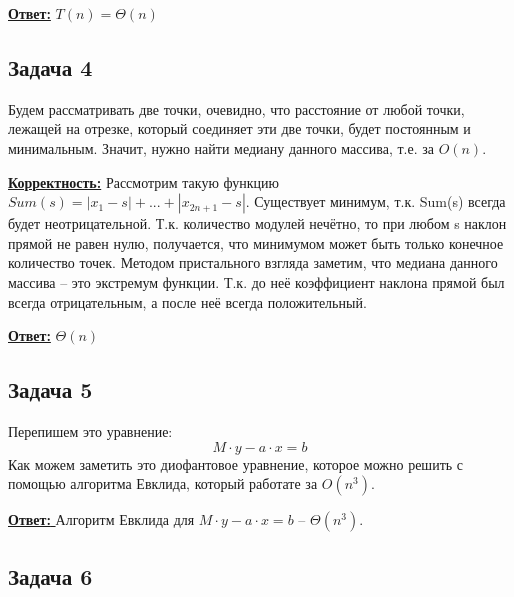\documentclass[a4paper,14pt]{article} %
\begin{document}
\underline{\textbf{Ответ:}} $T(n) = \Theta(n)$

\subsection{Задача 4}
Будем рассматривать две точки, очевидно, что расстояние от любой точки, лежащей на отрезке, который соединяет эти две точки, будет постоянным и минимальным.
Значит, нужно найти медиану данного массива, т.е. за $O(n)$.

\underline{\textbf{Корректность:}} Рассмотрим такую функцию $Sum(s) = |x_1 - s| + ... + |x_{2n+1} - s|$.
Существует минимум, т.к. Sum(s) всегда будет неотрицательной. Т.к. количество модулей нечётно, то при любом s наклон прямой не равен нулю, получается, что минимумом может быть только конечное количество точек.
Методом пристального взгляда заметим, что медиана данного массива -- это экстремум функции. Т.к. до неё коэффициент наклона прямой был всегда отрицательным, а после неё всегда положительный.

\underline{\textbf{Ответ:}} $\Theta(n)$

\subsection{Задача 5}
Перепишем это уравнение:
\begin{equation*}
	M \cdot y - a \cdot x = b
\end{equation*}
Как можем заметить это диофантовое уравнение, которое можно решить с помощью алгоритма Евклида, который работате за $O(n^3)$.

\underline{\textbf{Ответ: }} Алгоритм Евклида для $M \cdot y - a \cdot x = b$ -- $\Theta(n^3)$. 


\subsection{Задача 6}
\end{document}
